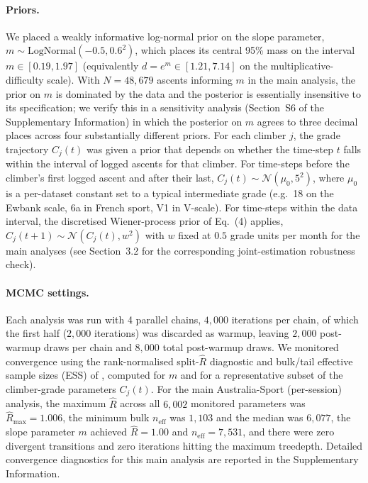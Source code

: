 \documentclass[12pt]{article}
\begin{document}
\paragraph{Priors.} We placed a weakly informative log-normal prior on the slope parameter, $m \sim \mathrm{LogNormal}(-0.5, 0.6^2)$, which places its central 95\% mass on the interval $m \in [0.19, 1.97]$ (equivalently $d = e^m \in [1.21, 7.14]$ on the multiplicative-difficulty scale). With $N=48{,}679$ ascents informing $m$ in the main analysis, the prior on $m$ is dominated by the data and the posterior is essentially insensitive to its specification; we verify this in a sensitivity analysis (Section~S6 of the Supplementary Information) in which the posterior on $m$ agrees to three decimal places across four substantially different priors. For each climber $j$, the grade trajectory $C_j(t)$ was given a prior that depends on whether the time-step $t$ falls within the interval of logged ascents for that climber. For time-steps before the climber's first logged ascent and after their last, $C_j(t) \sim \mathcal{N}(\mu_0, 5^2)$, where $\mu_0$ is a per-dataset constant set to a typical intermediate grade (e.g.\ 18 on the Ewbank scale, 6a in French sport, V1 in V-scale). For time-steps within the data interval, the discretised Wiener-process prior of Eq.~(4) applies, $C_j(t+1) \sim \mathcal{N}(C_j(t), w^2)$ with $w$ fixed at $0.5$ grade units per month for the main analyses (see Section~3.2 for the corresponding joint-estimation robustness check).

\paragraph{MCMC settings.} Each analysis was run with 4 parallel chains, $4{,}000$ iterations per chain, of which the first half ($2{,}000$ iterations) was discarded as warmup, leaving $2{,}000$ post-warmup draws per chain and $8{,}000$ total post-warmup draws. We monitored convergence using the rank-normalised split-$\hat{R}$ diagnostic and bulk/tail effective sample sizes (ESS) of \citet{vehtari2021rank}, computed for $m$ and for a representative subset of the climber-grade parameters $C_j(t)$. For the main Australia-Sport (per-session) analysis, the maximum $\hat{R}$ across all $6{,}002$ monitored parameters was $\hat{R}_{\max} = 1.006$, the minimum bulk $n_{\mathrm{eff}}$ was $1{,}103$ and the median was $6{,}077$, the slope parameter $m$ achieved $\hat{R} = 1.00$ and $n_{\mathrm{eff}} = 7{,}531$, and there were zero divergent transitions and zero iterations hitting the maximum treedepth. Detailed convergence diagnostics for this main analysis are reported in the Supplementary Information.
\end{document}
